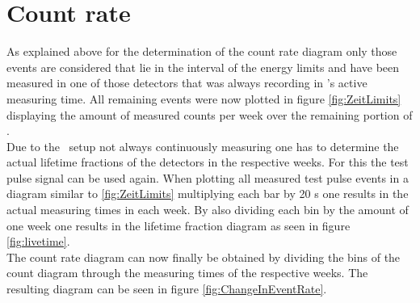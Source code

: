 \section{Count rate}

As explained above for the determination of the count rate diagram only those events are considered that lie in the interval of the energy limits and have been measured in one of those detectors that was always recording in \gerda's active measuring time. 
All remaining events were now plotted in figure \ref{fig:ZeitLimits} displaying the amount of measured counts per week over the remaining portion of \PII.
\\

Due to the \gerda\ setup not always continuously measuring one has to determine the actual lifetime fractions of the detectors in the respective weeks.
For this the test pulse signal can be used again.
When plotting all measured test pulse events in a diagram similar to \ref{fig:ZeitLimits} multiplying each bar by 20 s one results in the actual measuring times in each week.
By also dividing each bin by the amount of one week one results in the lifetime fraction diagram as seen in figure \ref{fig:livetime}.
\\

The count rate diagram can now finally be obtained by dividing the bins of the count diagram through the measuring times of the respective weeks.
The resulting diagram can be seen in figure \ref{fig:ChangeInEventRate}.

